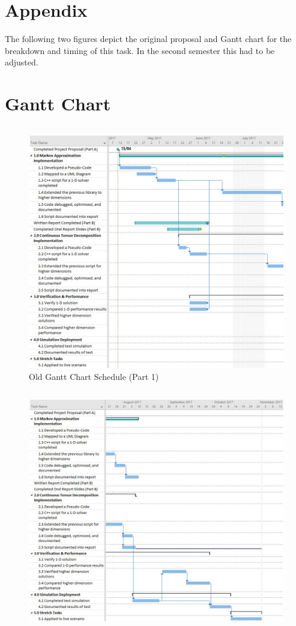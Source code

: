 \documentclass[11pt,draftd]{article}
\begin{document}
\section{Appendix}
\begin{appendices}
	The following two figures depict the original proposal and Gantt chart for the breakdown and timing of this task. In the second semester this had to be adjusted.
	\section{Gantt Chart}\label{app_itemA}
	\[\]
	\[\]
	\[\]
	\begin{figure}[h]
		\centering
		\includegraphics[scale=.6]{images/OldGanttPart1}
		\caption{Old Gantt Chart Schedule (Part 1)}
	\end{figure}
	\newpage
	\[\]
	\[\]
	\[\]
	\begin{figure}[h]
		\centering
		\includegraphics[scale=.6]{images/OldGanttPart2}

\end{figure}
\end{appendices}
\end{document}

